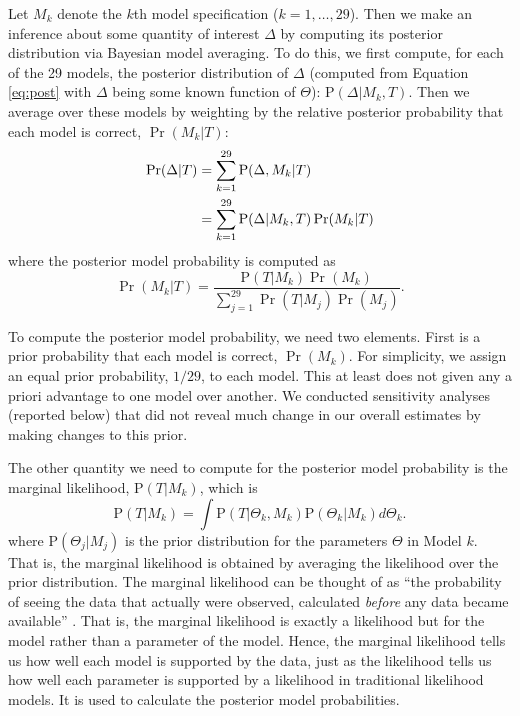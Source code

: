 \documentclass[11pt,titlepage]{article}
\renewcommand{\P}{\text{P}}
\begin{document}
Let $M_k$ denote the $k$th model specification ($k=1,\dots,29$). Then
we make an inference about some quantity of interest $\Delta$ by
computing its posterior distribution via Bayesian model averaging.  To
do this, we first compute, for each of the 29 models, the posterior
distribution of $\Delta$ (computed from Equation \ref{eq:post} with
$\Delta$ being some known function of $\Theta$): $\P(\Delta|M_k,T)$.
Then we average over these models by weighting by the relative
posterior probability that each model is correct, $\Pr(M_k|T)$:
\begin{align} \label{eq:bma}
  \Pr(\Delta|T) &= \sum_{k=1}^{29} \P(\Delta,M_k|T)\notag\\
                &= \sum_{k=1}^{29} \P(\Delta|M_k,T) \Pr(M_k|T)
\end{align}
where the posterior model probability is computed as
\begin{equation}
  \Pr(M_k|T)=\frac{\P(T|M_k)\Pr(M_k)}
             {\sum_{j=1}^{29} \Pr(T|M_j) \Pr(M_j)}.  \label{eq:postmodel}
\end{equation}

To compute the posterior model probability, we need two elements.
First is a prior probability that each model is correct, $\Pr(M_k)$.
For simplicity, we assign an equal prior probability, $1/29$, to each
model.  This at least does not given any a priori advantage to one
model over another.  We conducted sensitivity analyses (reported
below) that did not reveal much change in our overall estimates by
making changes to this prior.

The other quantity we need to compute for the posterior model
probability is the marginal likelihood, $\P(T|M_k)$, which is
\begin{equation}
  \P(T|M_k) = \int \P(T|\Theta_k, M_k) \P(\Theta_k|M_k) d\Theta_k. 
  \label{eq:marglik}
\end{equation} 
where $\P(\Theta_j|M_j)$ is the prior distribution for the parameters
$\Theta$ in Model $k$. That is, the marginal likelihood is obtained by
averaging the likelihood over the prior distribution.  The marginal
likelihood can be thought of as ``the probability of seeing the data
that actually were observed, calculated \emph{before} any data became
available'' \cite[p.776]{kass:raft:95}.  That is, the marginal
likelihood is exactly a likelihood but for the model rather than a
parameter of the model.  Hence, the marginal likelihood tells us how
well each model is supported by the data, just as the likelihood tells
us how well each parameter is supported by a likelihood in traditional
likelihood models.  It is used to calculate the posterior model
probabilities.
\end{document}
